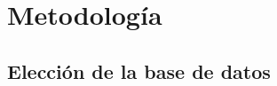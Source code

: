 \chapter{Metodología}\label{chapter:metodologia}

%


\section{Elección de la base de datos} \label{sect:eleccion_bd}
